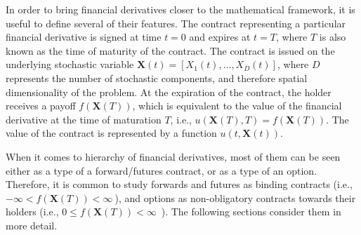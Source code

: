 \documentclass{UUThesisTemplate}
\begin{document}
\par In order to bring financial derivatives closer to the mathematical framework, it is useful to define several of their features. The contract representing a particular financial derivative is signed at time $t=0$ and expires at $t=T$, where $T$ is also known as the time of maturity of the contract. The contract is issued on the underlying stochastic variable $\mathbf{X}(t)=\left[X_1(t),\ldots,X_D(t)\right]$, where $D$ represents the number of stochastic components, and therefore spatial dimensionality of the problem. At the expiration of the contract, the holder receives a payoff $f(\mathbf{X}(T))$, which is equivalent to the value of the financial derivative at the time of maturation $T$, i.e., $u(\mathbf{X}(T),T) = f(\mathbf{X}(T))$. The value of the contract is represented by a function $u(t,\mathbf{X}(t))$.
\par When it comes to hierarchy of financial derivatives, most of them can be seen either as a type of a forward/futures contract, or as a type of an option. Therefore, it is common to study forwards and futures as binding contracts (i.e., $-\infty < f(\mathbf{X}(T)) < \infty\ $), and options as non-obligatory contracts towards their holders (i.e., $0\leq f(\mathbf{X}(T))<\infty$\ ). The following sections consider them in more detail.
%
\end{document}
